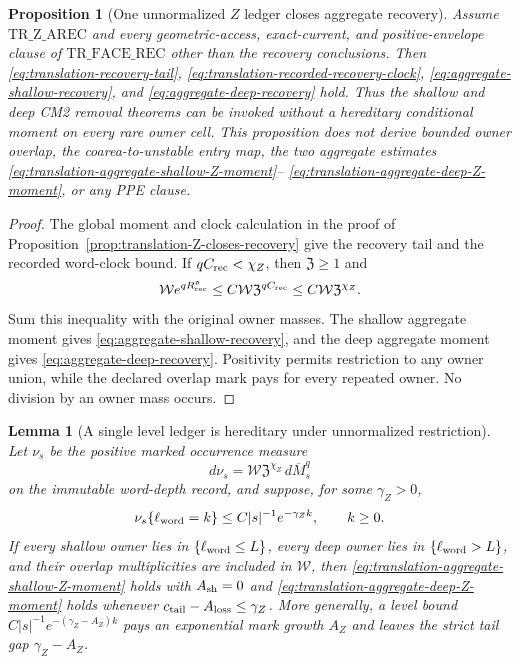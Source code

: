 \documentclass[11pt]{article}
\newtheorem{proposition}[theorem]{Proposition}
\newtheorem{lemma}[theorem]{Lemma}
\begin{document}
\begin{proposition}[One unnormalized $Z$ ledger closes aggregate recovery]
\label{prop:translation-aggregate-Z-closes-recovery}
Assume $\mathrm{TR\_Z\_AREC}$ and every geometric-access,
exact-current, and positive-envelope clause of
$\mathrm{TR\_FACE\_REC}$ other than the recovery conclusions.  Then
\eqref{eq:translation-recovery-tail},
\eqref{eq:translation-recorded-recovery-clock},
\eqref{eq:aggregate-shallow-recovery}, and
\eqref{eq:aggregate-deep-recovery} hold.  Thus the shallow and deep CM2
removal theorems can be invoked without a hereditary conditional moment on
every rare owner cell.  This proposition does not derive bounded owner
overlap, the coarea-to-unstable entry map, the two aggregate estimates
\eqref{eq:translation-aggregate-shallow-Z-moment}--
\eqref{eq:translation-aggregate-deep-Z-moment}, or any PPE clause.
\end{proposition}

\begin{proof}
The global moment and clock calculation in the proof of
Proposition~\ref{prop:translation-Z-closes-recovery} give the recovery tail
and the recorded word-clock bound.  If
$qC_{\rm rec}<\chi_Z$, then $\mathfrak Z\ge1$ and
\[
 \mathcal W e^{qR_{\rm rec}^{\mathfrak o}}
 \le C\mathcal W\mathfrak Z^{qC_{\rm rec}}
 \le C\mathcal W\mathfrak Z^{\chi_Z}.
\]
Sum this inequality with the original owner masses.  The shallow aggregate
moment gives \eqref{eq:aggregate-shallow-recovery}, and the deep aggregate
moment gives \eqref{eq:aggregate-deep-recovery}.  Positivity permits
restriction to any owner union, while the declared overlap mark pays for
every repeated owner.  No division by an owner mass occurs.
\end{proof}

\begin{lemma}[A single level ledger is hereditary under unnormalized
restriction]
\label{lem:unnormalized-level-ledger}
Let $\nu_s$ be the positive marked occurrence measure
\[
 d\nu_s=\mathcal W\mathfrak Z^{\chi_Z}\,d\overline M_s^q
\]
on the immutable word-depth record, and suppose, for some $\gamma_Z>0$,
\begin{equation}
\label{eq:unnormalized-level-ledger}
 \nu_s\{\ell_{\rm word}=k\}
 \le C|s|^{-1}e^{-\gamma_Zk},\qquad k\ge0.
\end{equation}
If every shallow owner lies in $\{\ell_{\rm word}\le L\}$, every deep
owner lies in $\{\ell_{\rm word}>L\}$, and their overlap multiplicities are
included in $\mathcal W$, then
\eqref{eq:translation-aggregate-shallow-Z-moment} holds with
$A_{\rm sh}=0$ and
\eqref{eq:translation-aggregate-deep-Z-moment} holds whenever
$c_{\rm tail}-A_{\rm loss}\le\gamma_Z$.  More generally, a level bound
$C|s|^{-1}e^{-(\gamma_Z-A_Z)k}$ pays an exponential mark growth $A_Z$ and
leaves the strict tail gap $\gamma_Z-A_Z$.
\end{lemma}
\end{document}
